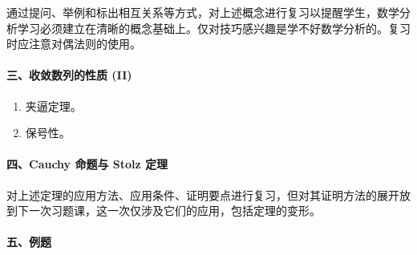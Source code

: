 通过提问、举例和标出相互关系等方式，对上述概念进行复习以提醒学生，数学分析学习必须建立在清晰的概念基础上。仅对技巧感兴趣是学不好数学分析的。复习时应注意对偶法则的使用。

\paragraph{三、收敛数列的性质 (II)}

\begin{enumerate}[label=\arabic*.]
  \item 夹逼定理。
  \item 保号性。
\end{enumerate}

\paragraph{四、Cauchy 命题与 Stolz 定理}

对上述定理的应用方法、应用条件、证明要点进行复习，但对其证明方法的展开放到下一次习题课，这一次仅涉及它们的应用，包括定理的变形。

\paragraph{五、例题}

